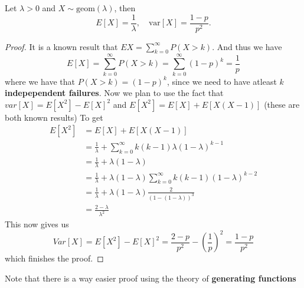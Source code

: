 \begin{theorem}
  Let $\lambda > 0$ and $X \sim \text{geom}(\lambda)$, then
  \begin{equation*}
    E[X] = \frac{1}{\lambda}, \quad \text{var}[X] = \frac{1 - p}{p^{2}}.
  \end{equation*}
\end{theorem}
\begin{proof} %
  It is a known result that $E{X} = \sum_{k=0}^{\infty} P(X > k)$. And thus we have
  \begin{equation*}
    E[X] = \sum_{k=0}^{\infty} P(X > k) = \sum_{k=0}^{\infty} (1 - p)^{k} = \frac{1}{p}
  \end{equation*}
  where we have that $P(X > k) = (1 - p)^{k}$, since we need to have atleast $k$ \textbf{indepependent failures}. Now we plan to use the fact that $var[X] = E[X^{2}] - E[X]^{2}$ and $E[X^{2}] = E[X] + E[X(X - 1)]$ (these are both known results) To get
  \begin{align*}
    E[X^{2}] &= E[X] + E[X(X-  1)] \\
            &= \frac{1}{\lambda} + \sum_{k=0}^{\infty} k(k - 1) \lambda(1 - \lambda)^{k - 1}\\
            &= \frac{1}{\lambda} + \lambda(1 - \lambda) \\
            &=\frac{1}{\lambda} + \lambda(1-\lambda)\sum_{k=0}^{\infty}k(k-1)(1-\lambda)^{k-2}\\
            &=\frac{1}{\lambda}+ \lambda(1-\lambda)\frac{2}{(1-(1-\lambda))^{3}} \\
            &=\frac{2-\lambda}{\lambda^2}
  \end{align*}
  This now gives us
  \begin{equation*}
    Var[X] = E[X^{2}] - E[X]^{2} = \frac{2 - p}{p^{2}} - \left(\frac{1}{p}\right)^{2} = \frac{1 - p}{p^{2}}
  \end{equation*}
  which finishes the proof.
\end{proof}
\begin{remark}
 Note that there is a way easier proof using the theory of \textbf{generating functions}
\end{remark}
